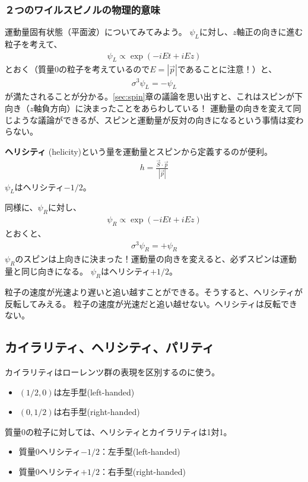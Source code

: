 \documentclass[10pt,a4paper]{jarticle}
\begin{document}
\subsubsection{２つのワイルスピノルの物理的意味}
運動量固有状態（平面波）についてみてみよう。
$\psi_L$に対し、$z$軸正の向きに進む粒子を考えて、
\begin{align}
\psi_L \propto \exp( -iEt + i E z )
\end{align}
とおく（質量0の粒子を考えているので$E = |\vec p|$であることに注意！）と、
\begin{align}
\sigma^3 \psi_L = - \psi_L
\end{align}
が満たされることが分かる。\ref{sec:spin}章の議論を思い出すと、これはスピンが下向き（$z$軸負方向）に決まったことをあらわしている！
運動量の向きを変えて同じような議論ができるが、スピンと運動量が反対の向きになるという事情は変わらない。

\textbf{ヘリシティ} (helicity)という量を運動量とスピンから定義するのが便利。
\begin{align}
h = \frac{\vec S \cdot \vec p}{|\vec p|}
\end{align}
$\psi_L$はヘリシティ$-1/2$。

同様に、$\psi_R$に対し、
\begin{align}
\psi_R \propto \exp( -iEt + i E z )
\end{align}
とおくと、
\begin{align}
\sigma^3 \psi_R = + \psi_R
\end{align}
$\psi_R$のスピンは上向きに決まった！運動量の向きを変えると、必ずスピンは運動量と同じ向きになる。
$\psi_R$はヘリシティ$+1/2$。

粒子の速度が光速より遅いと追い越すことができる。そうすると、ヘリシティが反転してみえる。
粒子の速度が光速だと追い越せない。ヘリシティは反転できない。





\subsection{カイラリティ、ヘリシティ、パリティ}
カイラリティはローレンツ群の表現を区別するのに使う。
\begin{itemize}
\item $(1/2,0)$は左手型(left-handed)
\item $(0,1/2)$は右手型(right-handed)
\end{itemize}


質量0の粒子に対しては、ヘリシティとカイラリティは1対1。
\begin{itemize}
\item 質量0ヘリシティ$-1/2$：左手型(left-handed)
\item 質量0ヘリシティ$+1/2$：右手型(right-handed)
\end{itemize}
\end{document}
